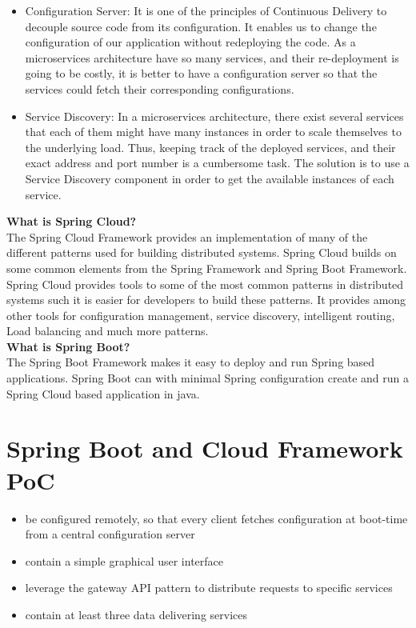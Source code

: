 \begin{itemize}
	\item Configuration Server: It is one of the principles of Continuous Delivery to decouple source code from its configuration. It enables us to change the configuration of our application without redeploying the code. As a microservices architecture have so many services, and their re-deployment is going to be costly, it is better to have a configuration server so that the services could fetch their corresponding configurations.
	\item Service Discovery: 
	In a microservices architecture, there exist several services that each of them might have many instances in order to scale themselves to the underlying load. Thus, keeping track of the deployed services, and their exact address and port number is a cumbersome task. The solution is to use a Service Discovery component in order to get the available instances of each service.\cite{newman2015building}	
\end{itemize}

\textbf{What is Spring Cloud?}\\
The Spring Cloud Framework provides an implementation of many of the different patterns used for building distributed systems. Spring Cloud builds on some common elements from the Spring Framework and Spring Boot Framework. Spring Cloud provides tools to some of the most common patterns in distributed systems such it is easier for developers to build these patterns. It provides among other tools for configuration management, service discovery, intelligent routing, Load balancing and much more patterns.\\

\textbf{What is Spring Boot?}\\
The Spring Boot Framework makes it easy to deploy and run Spring based applications. Spring Boot can with minimal Spring configuration create and run a \eg Spring Cloud based application in java. \cite{SpringDocker}  \\


\section{Spring Boot and Cloud Framework PoC}
\begin{itemize}
	\item be configured remotely, so that every client fetches configuration at boot-time from a central configuration server
	\item contain a simple graphical user interface
	\item leverage the gateway API pattern to distribute requests to specific services
	\item contain at least three data delivering services 
\end{itemize}

